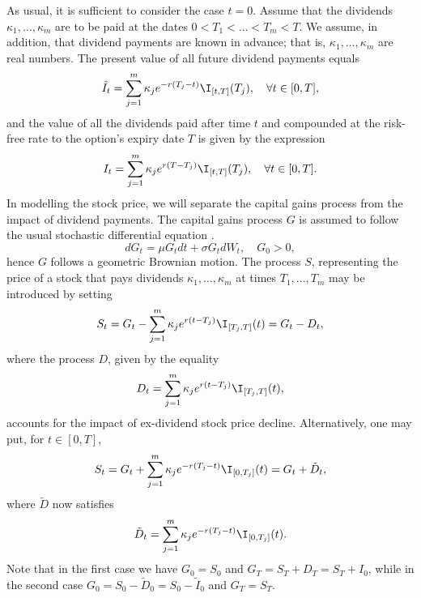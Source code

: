 As usual, it is sufficient to consider the case \(t = 0\). Assume that the dividends \(\kappa_1, \dots, \kappa_m\) are to be paid at the dates \(0 < T_1 < \dots < T_m < T\). We assume, in addition, that dividend payments are known in advance; that is, \(\kappa_1, \dots, \kappa_m\) are real numbers. The present value of all future dividend payments equals
\begin{equation}
	\tilde{I}_t = \sum_{j=1}^{m} \kappa_j e^{-r(T_j - t)} \I_{[t, T]}(T_j), \quad \forall t \in [0, T],
	\label{eq:PresentValueDividends}
\end{equation}
and the value of all the dividends paid after time \(t\) and compounded at the risk-free rate to the option's expiry date \(T\) is given by the expression
\begin{equation}
	I_t = \sum_{j=1}^{m} \kappa_j e^{r(T - T_j)} \I_{[t, T]}(T_j), \quad \forall t \in [0, T].
	\label{eq:CompoundedValueDividends}
\end{equation}
In modelling the stock price, we will separate the capital gains process from the impact of dividend payments. The capital gains process \(G\) is assumed to follow the usual stochastic differential equation \citep{heath_ex-dividend_1988}.
\begin{equation}
	dG_t = \mu G_t dt + \sigma G_t dW_t, \quad G_0 > 0,
	\label{eq:GeometricBrownianMotionG}
\end{equation}
hence \(G\) follows a geometric Brownian motion. The process \(S\), representing the price of a stock that pays dividends \(\kappa_1, \dots, \kappa_m\) at times \(T_1, \dots, T_m\) may be introduced by setting
\begin{equation}
	S_t = G_t - \sum_{j=1}^{m} \kappa_j e^{r(t-T_j)} \I_{[T_j, T]}(t) = G_t - D_t,
	\label{eq:StockPriceDividendsOne}
\end{equation}
where the process \(D\), given by the equality
\begin{equation}
	D_t = \sum_{j=1}^{m} \kappa_j e^{r(t-T_j)} \I_{[T_j, T]}(t),
	\label{eq:DividendProcessOne}
\end{equation}
accounts for the impact of ex-dividend stock price decline. Alternatively, one may put, for \(t \in [0, T]\),
\begin{equation}
	S_t = G_t + \sum_{j=1}^{m} \kappa_j e^{-r(T_j - t)} \I_{[0, T_j]}(t) = G_t + \tilde{D}_t,
	\label{eq:StockPriceDividendsTwo}
\end{equation}
where \(\tilde{D}\) now satisfies
\begin{equation}
	\tilde{D}_t = \sum_{j=1}^{m} \kappa_j e^{-r(T_j - t)} \I_{[0, T_j]}(t).
	\label{eq:DividendProcessTwo}
\end{equation}
Note that in the first case we have \(G_0 = S_0\) and \(G_T = S_T + D_T = S_T + I_0\), while in the second case \(G_0 = S_0 - \tilde{D}_0 = S_0 - \tilde{I}_0\) and \(G_T = S_T\).

